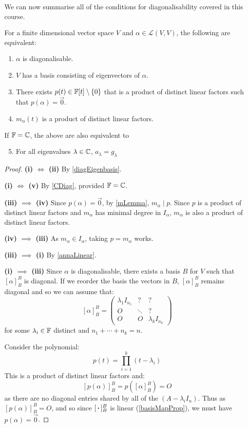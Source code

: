 \documentclass[../main.tex]{subfiles}
\begin{document}
We can now summarise all of the conditions for diagonalisability covered in this course.
\begin{theorem}
  For a finite dimensional vector space $V$ and $\alpha \in \mathcal{L}(V, V)$, the following are equivalent: \label{diagEquiv}
  \begin{enumerate}
    \item $\alpha$ is diagonalisable.
    \item $V$ has a basis consisting of eigenvectors of $\alpha$.
    \item There exists $p(t) \in \mathbb{F}[t] \setminus \{0\}$ that is a product of distinct linear factors such that $p(\alpha) = \vec{0}$.
    \item $m_{\alpha}(t)$ is a product of distinct linear factors.
  \end{enumerate}
  If $\mathbb{F} = \mathbb{C}$, the above are also equivalent to
  \begin{enumerate}
    \setcounter{enumi}{4}
    \item For all eigenvalues $\lambda \in \mathbb{C}$, $a_{\lambda} = g_{\lambda}$
  \end{enumerate}
\end{theorem}
\begin{proof}\par
  \textbf{(i) $\iff$ (ii)} By \cref{diagEigenbasis}. \par
  \textbf{(i) $\iff$ (v)} By \cref{CDiag}, provided $\mathbb{F} = \mathbb{C}$. \par
  \textbf{(iii) $\implies$ (iv)} Since $p(\alpha) = \vec{0}$, by \cref{mLemma}, $m_{\alpha} \mid p$.
  Since $p$ is a product of distinct linear factors and $m_{\alpha}$ has minimal degree in $I_{\alpha}$, $m_{\alpha}$ is also a product of distinct linear factors. \par
  \textbf{(iv) $\implies$ (iii)} As $m_{\alpha} \in I_{\alpha}$, taking $p = m_{\alpha}$ works. \par
  \textbf{(iii) $\implies$ (i)} By \cref{annaLinear}. \par
  \textbf{(i) $\implies$ (iii)} Since $\alpha$ is diagonalisable, there exists a basis $B$ for $V$ such that $[\alpha]^{B}_{B}$ is diagonal.
  If we reorder the basis the vectors in $B$, $[\alpha]^{B}_{B}$ remains diagonal and so we can assume that:
  \[
    [\alpha]^{B}_{B} =
    \left(\begin{array}{c|c|c}
      \lambda_1 I_{n_1} & ? &? \\ \hline
      O & \ddots & ? \\ \hline
      O & O & \lambda_k I_{n_k}
    \end{array}\right)
  \]
  for some $\lambda_i \in \mathbb{F}$ distinct and $n_1 + \cdots + n_k = n$.

  Consider the polynomial:
  \[
    p(t) = \prod_{i = 1}^{k} (t - \lambda_i)
  \]
  This is a product of distinct linear factors and:
  \[
    [p(\alpha)]^{B}_{B} = p([\alpha]^{B}_{B}) = O
  \]
  as there are no diagonal entries shared by all of the $(A - \lambda_i I_n)$.
  Thus as $[p(\alpha)]^{B}_{B} = O$, and so since $[{\hspace{0.18em}\boldsymbol{\cdot}\hspace{0.18em}}]^{B}_{B}$ is linear (\cref{basisMapProp}), we must have $p(\alpha) = \vec{0}$.
\end{proof}
\end{document}
